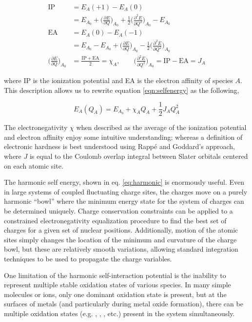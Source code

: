 \begin{align*}
\mathrm{IP} &= E_A(+1) - E_A(0) \\
& = E_{A_0} + \bigg (\frac{\partial E}{\partial Q}\bigg)_{A_0} + \frac{1}{2}\bigg(\frac{\partial^2E}{\partial Q^2}\bigg)_{A_0} - E_{A_0} \\
\mathrm{EA} &= E_A(0) - E_A(-1) \\
& = E_{A_0} - E_{A_0} + \bigg (\frac{\partial E}{\partial Q}\bigg)_{A_0} - \frac{1}{2}\bigg(\frac{\partial^2E}{\partial Q^2}\bigg)_{A_0}  \\
\bigg (\frac{\partial E}{\partial Q}\bigg)_{A_0} &= \frac{\mathrm{IP+EA}}{2} = \chi_A ,\qquad \bigg (\frac{\partial^2 E}{\partial Q^2}\bigg)_{A_0} = \mathrm{IP-EA} = J_A
\end{align*}

where IP is the ionization potential and EA is the electron affinity of species
$A$.  This description allows us to rewrite equation \ref{eqn:selfenergy} as
the following,

\begin{equation}
E_A(Q_A) = E_{A_0} + \chi_A Q_A + \frac{1}{2} J_{A} Q_A^2
\label{eq:harmonic}
\end{equation}

The electronegativity $\chi$ when described as the average of the ionization
potential and electron affinity enjoy some intuitive understanding; whereas a
definition of electronic hardness is best understood using Rapp\'e and
Goddard's approach, where $J$ is equal to the Coulomb overlap integral between
Slater orbitals centered on each atomic site\citep{Rappe:1991dq}.

The harmonic self energy, shown in eq. \ref{eq:harmonic} is enormously useful.
Even in large systems of coupled fluctuating charge sites, the charges move on
a purely harmonic ``bowl'' where the minimum energy state for the system of
charges can be determined uniquely. Charge conservation constraints can be
applied to a constrained electronegativity equalization procedure to find the
best set of charges for a given set of nuclear positions.  Additionally, motion
of the atomic sites simply changes the location of the minimum and curvature of
the charge bowl, but these are relatively smooth variations, allowing standard
integration techniques to be used to propagate the charge variables.

One limitation of the harmonic self-interaction potential is the inability to
represent multiple stable oxidation states of various species. In many simple
molecules or ions, only one dominant oxidation state is present, but at the
surfaces of metals (and particularly during metal oxide formation), there can
be multiple oxidation states (e.g. , , , etc.)
present in the system simultaneously.

